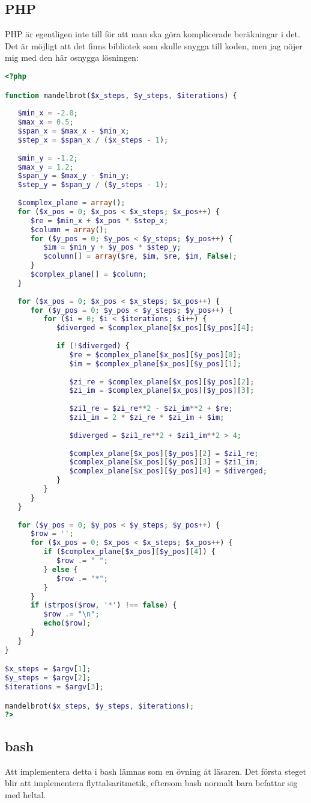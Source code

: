 \documentclass[10pt, twoside,a4paper]{article}
\begin{document}
\subsection{PHP}
PHP är egentligen inte till för att man ska göra komplicerade beräkningar i det. Det är möjligt att det finns bibliotek som skulle snygga till koden, men jag nöjer mig med den här osnygga lösningen:
\begin{lstlisting}[language=PHP]
<?php

function mandelbrot($x_steps, $y_steps, $iterations) {
   
   $min_x = -2.0;
   $max_x = 0.5;
   $span_x = $max_x - $min_x;
   $step_x = $span_x / ($x_steps - 1);
   
   $min_y = -1.2;
   $max_y = 1.2;
   $span_y = $max_y - $min_y;
   $step_y = $span_y / ($y_steps - 1);
   
   $complex_plane = array();
   for ($x_pos = 0; $x_pos < $x_steps; $x_pos++) {
      $re = $min_x + $x_pos * $step_x;
      $column = array();
      for ($y_pos = 0; $y_pos < $y_steps; $y_pos++) {
         $im = $min_y + $y_pos * $step_y;
         $column[] = array($re, $im, $re, $im, False);
      }
      $complex_plane[] = $column;
   }
   
   for ($x_pos = 0; $x_pos < $x_steps; $x_pos++) {
      for ($y_pos = 0; $y_pos < $y_steps; $y_pos++) {
         for ($i = 0; $i < $iterations; $i++) { 
            $diverged = $complex_plane[$x_pos][$y_pos][4];
            
            if (!$diverged) {
               $re = $complex_plane[$x_pos][$y_pos][0];
               $im = $complex_plane[$x_pos][$y_pos][1];
               
               $zi_re = $complex_plane[$x_pos][$y_pos][2];
               $zi_im = $complex_plane[$x_pos][$y_pos][3];
               
               $zi1_re = $zi_re**2 - $zi_im**2 + $re;
               $zi1_im = 2 * $zi_re * $zi_im + $im;
               
               $diverged = $zi1_re**2 + $zi1_im**2 > 4;
               
               $complex_plane[$x_pos][$y_pos][2] = $zi1_re;
               $complex_plane[$x_pos][$y_pos][3] = $zi1_im;
               $complex_plane[$x_pos][$y_pos][4] = $diverged;
            }
         }
      }
   }
   
   for ($y_pos = 0; $y_pos < $y_steps; $y_pos++) {
      $row = '';
      for ($x_pos = 0; $x_pos < $x_steps; $x_pos++) {
         if ($complex_plane[$x_pos][$y_pos][4]) {
            $row .= " ";
         } else {
            $row .= "*";
         }
      }
      if (strpos($row, '*') !== false) {
         $row .= "\n";
         echo($row);
      }
   }
}

$x_steps = $argv[1];
$y_steps = $argv[2];
$iterations = $argv[3];

mandelbrot($x_steps, $y_steps, $iterations);
?>
\end{lstlisting}


\newpage
\subsection{bash}
Att implementera detta i bash lämnas som en övning åt läsaren. Det första steget blir att implementera flyttalsaritmetik, eftersom bash normalt bara befattar sig med heltal.
\end{document}
